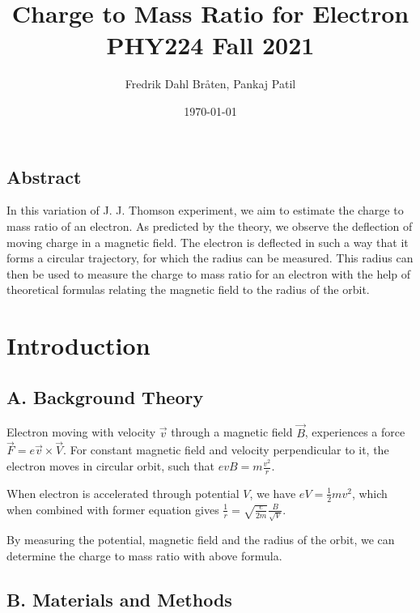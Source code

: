 \documentclass[a4paper,12pt]{article}
\begin{document}
\title{Charge to Mass Ratio for Electron \\
\large PHY224 Fall 2021}
\author{Fredrik Dahl Bråten, Pankaj Patil}
\date{\today}
\maketitle
\begin{center}
	\section*{Abstract}
\end{center}

In this variation of J. J. Thomson experiment, we aim to estimate the charge to mass ratio of an electron.
As predicted by the theory, we observe the deflection of moving charge in a magnetic field. The electron 
is deflected in such a way that it forms a circular trajectory, for which the radius can be measured. This
radius can then be used to measure the charge to mass ratio for an electron with the help of theoretical formulas
relating the magnetic field to the radius of the orbit. 

\section{Introduction}

\subsection*{A. Background Theory}

Electron moving with velocity $\vec{v}$ through a magnetic field $\vec{B}$, experiences a force $\vec{F} = e\vec{v}\times \vec{V}$.
For constant magnetic field and velocity perpendicular to it, the electron moves in circular orbit, such that $evB = m\frac{v^2}{r}$.

When electron is accelerated through potential $V$, we have $eV = \frac{1}{2}mv^2$, which when combined with former 
equation gives $\frac{1}{r} = \sqrt{\frac{e}{2m}} \frac{B}{\sqrt{V}}$.

By measuring the potential, magnetic field and the radius of the orbit, we can determine the charge to mass ratio with above formula. 

\subsection*{B. Materials and Methods}
\end{document}
